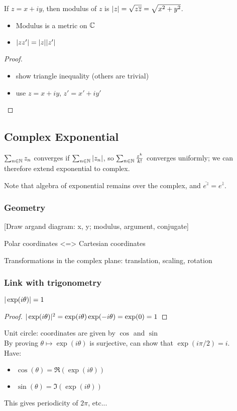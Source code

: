 \begin{definition}[Modulus]
    If $z=x+iy$, then modulus of $z$ is $| z |=\sqrt{z\overline{z}}=\sqrt{x^2+y^2}$.
\end{definition}
\begin{property}
    \begin{itemize}
        \item Modulus is a metric on $\mathbb{C}$
        \item $| zz' |=| z || z' |$
    \end{itemize}
\end{property}
\begin{proof}
    \begin{itemize}
        \item show triangle inequality (others are trivial)
        \item use $z=x+iy$, $z'=x'+iy'$
    \end{itemize}
\end{proof}



\subsection{Complex Exponential}
$\sum_{n \in \mathbb{N}}z_n$ converges if $\sum_{n \in \mathbb{N}}| z_n |$, so $\sum_{n \in \mathbb{N}}\frac{z^k}{k!}$ converges uniformly; we can therefore extend exponential to complex.

Note that algebra of exponential remains over the complex, and $\overline{e^z}=e^{\overline{z}}$.

\subsubsection{Geometry}
[Draw argand diagram: x, y; modulus, argument, conjugate]

Polar coordinates <=> Cartesian coordinates

Transformations in the complex plane: translation, scaling, rotation

\subsubsection{Link with trigonometry}
\begin{property}
    $| \exp(i\theta) | = 1$
\end{property}
\begin{proof}
    $| \exp(i\theta) |^2 = \exp(i\theta)\exp(-i\theta) = \exp(0) = 1$
\end{proof}
Unit circle: coordinates are given by $\cos$ and $\sin$\\
By proving $\theta \mapsto \exp(i\theta)$ is surjective, can show that $\exp(i\pi/2)=i$.\\
Have:
\begin{itemize}
    \item $\cos(\theta) = \Re(\exp(i\theta))$
    \item $\sin(\theta) = \Im(\exp(i\theta))$
\end{itemize}
This gives periodicity of $2\pi$, etc...

